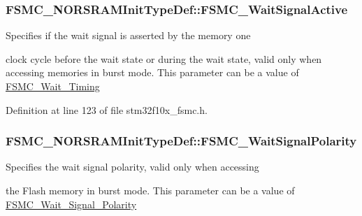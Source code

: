 \hypertarget{struct_f_s_m_c___n_o_r_s_r_a_m_init_type_def_a71c6e7cc8e7e1a8fd0562960ffd23e88}{
\subsubsection[{F\-S\-M\-C\-\_\-\-Wait\-Signal\-Active}]{ F\-S\-M\-C\-\_\-\-N\-O\-R\-S\-R\-A\-M\-Init\-Type\-Def\-::\-F\-S\-M\-C\-\_\-\-Wait\-Signal\-Active}}\label{struct_f_s_m_c___n_o_r_s_r_a_m_init_type_def_a71c6e7cc8e7e1a8fd0562960ffd23e88}
\begin{DoxyVerb}    Specifies if the wait signal is asserted by the memory one
\end{DoxyVerb}
 clock cycle before the wait state or during the wait state, valid only when accessing memories in burst mode. This parameter can be a value of \hyperlink{group___f_s_m_c___wait___timing}{F\-S\-M\-C\-\_\-\-Wait\-\_\-\-Timing} 

Definition at line 123 of file stm32f10x\-\_\-fsmc.\-h.

\hypertarget{struct_f_s_m_c___n_o_r_s_r_a_m_init_type_def_a5d4d76594fc201943b51095e3ef34791}{
\subsubsection[{F\-S\-M\-C\-\_\-\-Wait\-Signal\-Polarity}]{ F\-S\-M\-C\-\_\-\-N\-O\-R\-S\-R\-A\-M\-Init\-Type\-Def\-::\-F\-S\-M\-C\-\_\-\-Wait\-Signal\-Polarity}}\label{struct_f_s_m_c___n_o_r_s_r_a_m_init_type_def_a5d4d76594fc201943b51095e3ef34791}
\begin{DoxyVerb}  Specifies the wait signal polarity, valid only when accessing
\end{DoxyVerb}
 the Flash memory in burst mode. This parameter can be a value of \hyperlink{group___f_s_m_c___wait___signal___polarity}{F\-S\-M\-C\-\_\-\-Wait\-\_\-\-Signal\-\_\-\-Polarity} 

